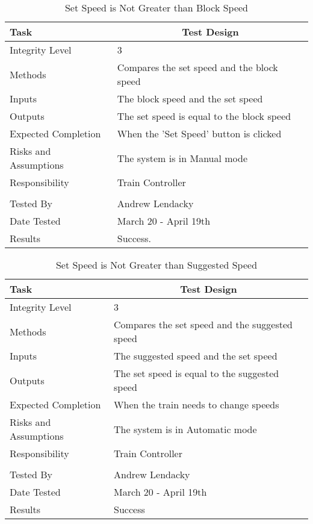 \documentclass[]{article}
\begin{document}
\begin{table}[H]
	\centering
	\caption{Set Speed is Not Greater than Block Speed}
	\begin{tabular}{|l|l|}
		\hline
		Task & \multicolumn{1}{c|}{Test Design} \\ \hline
		Integrity Level & 3 \\ \hline
		Methods & Compares the set speed and the block speed\\ \hline
		Inputs & The block speed and the set speed\\ \hline
		Outputs & The set speed is equal to the block speed \\ \hline
		Expected Completion & When the 'Set Speed' button is clicked\\ \hline
		Risks and Assumptions & The system is in Manual mode\\ \hline
		Responsibility & Train Controller\\ \hline
			\\ \hline
		Tested By   &  Andrew Lendacky\\	\hline
		Date Tested & \parbox[t]{10cm}{March 20 - April 19th}\\ \hline
		Results & Success.\\ \hline
	\end{tabular}
\end{table}

\begin{table}[H]
	\centering
	\caption{Set Speed is Not Greater than Suggested Speed}
	\begin{tabular}{|l|l|}
		\hline
		Task & \multicolumn{1}{c|}{Test Design} \\ \hline
		Integrity Level & 3 \\ \hline
		Methods & Compares the set speed and the suggested speed\\ \hline
		Inputs & The suggested speed and the set speed\\ \hline
		Outputs & The set speed is equal to the suggested speed \\ \hline
		Expected Completion & When the train needs to change speeds\\ \hline
		Risks and Assumptions & The system is in Automatic mode \\ \hline
		Responsibility &  Train Controller\\ \hline
			\\ \hline
		Tested By   &  Andrew Lendacky\\	\hline
		Date Tested & \parbox[t]{10cm}{March 20 - April 19th}\\ \hline
		Results & Success\\ \hline
	\end{tabular}
\end{table}
\end{document}
